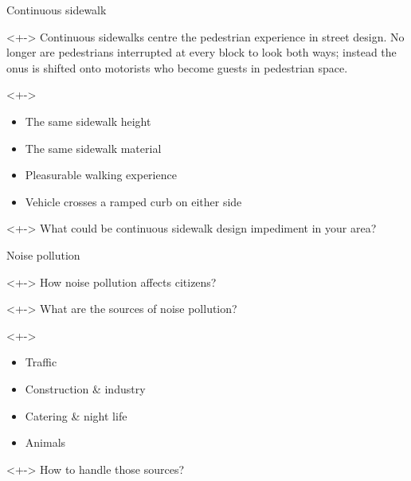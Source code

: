\documentclass{beamer}
\begin{document}
    \begin{frame}{Continuous sidewalk}
        \begin{block}
            <+->{}
            Continuous sidewalks centre the pedestrian experience in street design. No longer are pedestrians interrupted at every block to look both ways; instead the onus is shifted onto motorists who become guests in pedestrian space.
        \end{block}
        \begin{block}
            <+->{}
            \begin{itemize}
                \item The same sidewalk height
                \item The same sidewalk material
                \item Pleasurable walking experience
                \item Vehicle crosses a ramped curb on either side
            \end{itemize}
        \end{block}
        \begin{block}
            <+->{}
            What could be continuous sidewalk design impediment in your area?
        \end{block}
    \end{frame}

    \begin{frame}{Noise pollution}
        \begin{block}
            <+->{}
            How noise pollution affects citizens?
        \end{block}
        \begin{block}
            <+->{}
            What are the sources of noise pollution?
        \end{block}
        \begin{block}
            <+->{}
            \begin{itemize}
                \item Traffic
                \item Construction \& industry
                \item Catering \& night life
                \item Animals
            \end{itemize}
        \end{block}
        \begin{block}
            <+->{}
            How to handle those sources?
        \end{block}
    \end{frame}
\end{document}
